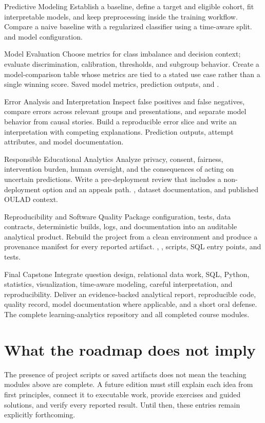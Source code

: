 \ForthcomingChapter
  {Predictive Modeling}
  {Establish a baseline, define a target and eligible cohort, fit interpretable
   models, and keep preprocessing inside the training workflow.}
  {Compare a naive baseline with a regularized classifier using a time-aware
   split.}
  { and model configuration.}

\ForthcomingChapter
  {Model Evaluation}
  {Choose metrics for class imbalance and decision context; evaluate
   discrimination, calibration, thresholds, and subgroup behavior.}
  {Create a model-comparison table whose metrics are tied to a stated use case
   rather than a single winning score.}
  {Saved model metrics, prediction outputs, and
   .}

\ForthcomingChapter
  {Error Analysis and Interpretation}
  {Inspect false positives and false negatives, compare errors across relevant
   groups and presentations, and separate model behavior from causal stories.}
  {Build a reproducible error slice and write an interpretation with competing
   explanations.}
  {Prediction outputs, attempt attributes, and model documentation.}

\ForthcomingChapter
  {Responsible Educational Analytics}
  {Analyze privacy, consent, fairness, intervention burden, human oversight,
   and the consequences of acting on uncertain predictions.}
  {Write a pre-deployment review that includes a non-deployment option and an
   appeals path.}
  {, dataset documentation, and published OULAD
   context.}

\ForthcomingChapter
  {Reproducibility and Software Quality}
  {Package configuration, tests, data contracts, deterministic builds, logs,
   and documentation into an auditable analytical product.}
  {Rebuild the project from a clean environment and produce a provenance
   manifest for every reported artifact.}
  {, , scripts, SQL entry
   points, and tests.}

\ForthcomingChapter
  {Final Capstone}
  {Integrate question design, relational data work, SQL, Python, statistics,
   visualization, time-aware modeling, careful interpretation, and
   reproducibility.}
  {Deliver an evidence-backed analytical report, reproducible code, quality
   record, model documentation where applicable, and a short oral defense.}
  {The complete learning-analytics repository and all completed course modules.}

\section{What the roadmap does not imply}

The presence of project scripts or saved artifacts does not mean the teaching
modules above are complete. A future edition must still explain each idea from
first principles, connect it to executable work, provide exercises and guided
solutions, and verify every reported result. Until then, these entries remain
explicitly forthcoming.
